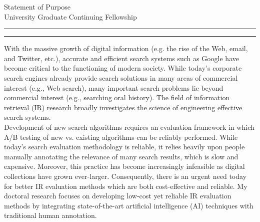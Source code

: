 \documentclass{article}
\newcommand{\soptitle}{Statement of Purpose}
\begin{document}
\begin{center}\LARGE\soptitle\\
\small University Graduate Continuing Fellowship
\end{center}
\hrule
\vspace{1pt}
\hrule height 1pt
\bigskip

 
 With the massive growth of digital information (e.g. the rise of the Web, email, and Twitter, etc.), accurate and efficient search systems such as Google have become critical to the functioning of modern society. While today's corporate search engines already provide search solutions in many areas of commercial interest (e.g., Web search), many important search problems lie beyond commercial interest (e.g., searching oral history). The field of information retrieval (IR) research broadly investigates the science of engineering effective search systems. \\

 Development of new search algorithms requires an evaluation framework in which A/B testing of new vs. existing algorithms can be reliably performed. While today's search evaluation methodology is reliable, it relies heavily upon people manually annotating the relevance of many search results, which is slow and expensive. Moreover, this practice has become increasingly infeasible as digital collections have grown ever-larger. Consequently, there is an urgent need today for better IR evaluation methods which are both cost-effective and reliable. My doctoral research focuses on developing low-cost yet reliable IR evaluation methods by integrating state-of-the-art artificial intelligence (AI) techniques with traditional human annotation. \\
 
\end{document}
